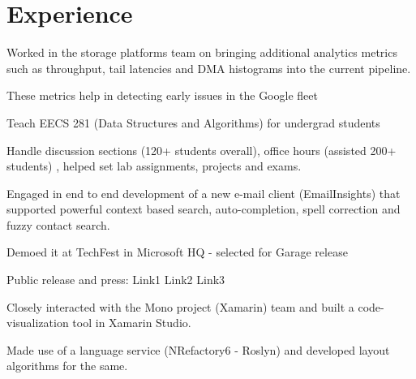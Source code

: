 \documentclass[]{resume-openfont}
\begin{document}
\begin{minipage}[t]{0.69\textwidth} 


\section{Experience}

\vspace{\topsep} %
\begin{tightemize}
\item Worked in the storage platforms team on bringing additional analytics metrics such as throughput, tail latencies and DMA histograms into the current pipeline.
\item These metrics help in detecting early issues in the Google fleet
\end{tightemize}
\sectionsep

\begin{tightemize}
\item Teach EECS 281 (Data Structures and Algorithms) for undergrad students
\item Handle discussion sections (120+ students overall), office hours (assisted 200+ students) , helped set lab assignments, projects and exams.
\end{tightemize}
\sectionsep

\begin{tightemize}
\item Engaged in end to end development of a new e-mail client (EmailInsights) that supported powerful context based search, auto-completion, spell correction and fuzzy contact search. 
\item Demoed it at TechFest in Microsoft HQ - selected for Garage release
\item Public release and press: Link1 Link2 Link3
\end{tightemize}
\sectionsep

\begin{tightemize}
\item Closely interacted with the Mono project (Xamarin) team and built a code-visualization tool in Xamarin Studio.
\item Made use of a language service (NRefactory6 - Roslyn) and developed layout algorithms for the same.
\end{tightemize}
\sectionsep


\end{minipage}
\end{document}
